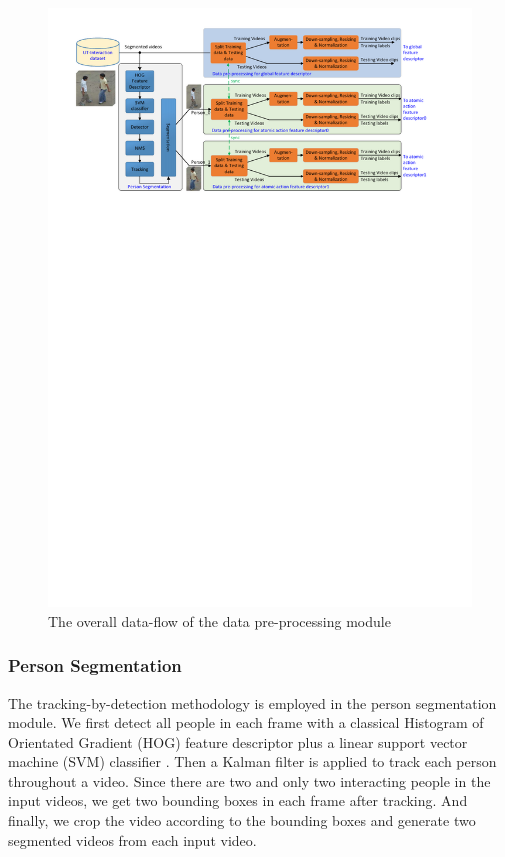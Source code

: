 \begin{figure}
	\includegraphics[trim=2cm 20.5cm 0cm 1cm]{fig01/vpp.pdf}
	\caption{The overall data-flow of the data pre-processing module}
	\label{fig:vpp}
\end{figure}

\subsubsection*{Person Segmentation}
\label{personDetection}
The tracking-by-detection methodology is employed in the person segmentation module. We first detect all people in each frame with a classical Histogram of Orientated Gradient (HOG) feature descriptor plus a linear support vector machine (SVM) classifier \cite{hog}. Then a Kalman filter is applied to track each person throughout a video. Since there are two and only two interacting people in the input videos, we get two bounding boxes in each frame after tracking. And finally, we crop the video according to the bounding boxes and generate two segmented videos from each input video.

